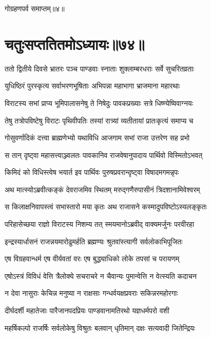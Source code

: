 गोग्रहणपर्व समाप्तम्॥४॥

\chapter{चतुःसप्ततितमोऽध्यायः॥७४॥}
\twolineshloka
{ततो द्वितीये दिवसे भ्रातरः पञ्च पाण्डवाः}
{स्नाताः शुक्लाम्बरधराः सर्वे सुचरितव्रताः}


\twolineshloka
{युधिष्ठिरं पुरस्कृत्य सर्वाभरणभूषिताः}
{अभिपन्ना महाभागा भ्राजमाना महारथाः}


\twolineshloka
{विराटस्य सभां प्राप्य भूमिपालासनेषु ते}
{निषेदुः पावकप्रख्याः सत्रे धिष्ण्येष्विवाग्नयः}


\twolineshloka
{तेषु तत्रोपविष्टेषु विराटः पृथिवीपतिः}
{तस्यां रात्र्यां व्यतीतायां प्रातःकृत्यं समाप्य च}


\twolineshloka
{गोसुवर्णादिकं दत्त्वा ब्राह्मणेभ्यो यथाविधि}
{आजगाम सभां राजा उत्तरेण सह प्रभो}


\twolineshloka
{स तान् दृष्ट्वा महासत्त्वाञ्ज्वलतः पावकानिव}
{राजवेषानुपादाय पार्थिवो विस्मितोऽभवत्}



\twolineshloka
{किमिदं को विधिस्त्वेष भयार्त इव पार्थिवः}
{पुरुषप्रवरान्दृष्ट्वा विषादमगमन्नृपः}


\twolineshloka
{अथ मात्स्योऽब्रवीत्कङ्कं देवराजमिव स्थितम्}
{मरुद्गणैरुपासीनं त्रिदशानामिवेश्वरम्}


\twolineshloka
{स किलाक्षनिवापस्त्वं सभास्तारो मया कृतः}
{अथ राजासने कस्मादुपविष्टोऽस्यलङ्कृतः}



\twolineshloka
{परिहासेच्छया राज्ञो विराटस्य निशम्य तत्}
{स्मयमानोऽब्रवीद् वाक्यमर्जुनः परवीरहा}


\twolineshloka
{इन्द्रस्यार्धासनं राजन्नयमारोढुमर्हति}
{ब्रह्मण्यः श्रुतवांस्त्यागी सर्वलोकाभिपूजितः}


\twolineshloka
{एष विग्रहवान्धर्म एष वीर्यवतां वरः}
{एष बुद्ध्याधिको लोके तपसां च परायणम्}


\twolineshloka
{एषोऽस्त्रं विविधं वेत्ति त्रैलोक्ये सचराचरे}
{न चैवान्यः पुमान्वेत्ति न वेत्स्यति कदाचन}


\twolineshloka
{न देवा नासुराः केचिन्न मनुष्या न राक्षसाः}
{गन्धर्वयक्षप्रवराः सकिन्नरमहोरगाः}


\twolineshloka
{दीर्घदर्शी महातेजाः पारैजानपदप्रियः}
{पाण्डवानामतिरथो यज्ञधर्मपरो वशी}


\twolineshloka
{महर्षिकल्पो राजर्षिः सर्वलोकेषु विश्रुतः}
{बलवान् धृतिमान् दक्षः सत्यवादी जितेन्द्रियः}


